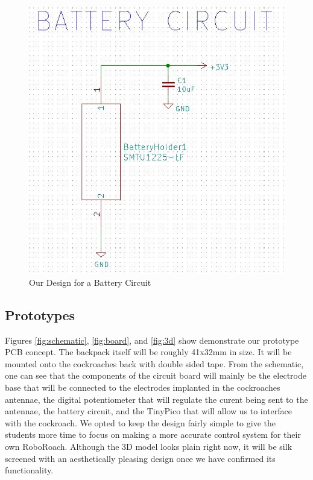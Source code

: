 \documentclass{article}
\begin{document}
\begin{figure}[ht!]
\centering
\includegraphics[scale=0.4]{Newbattery.JPG}
\caption{Our Design for a Battery Circuit}
\label{fig:newbatt}
\end{figure}

\subsection{Prototypes}
\par Figures \ref{fig:schematic}, \ref{fig:board}, and \ref{fig:3d} show demonstrate our prototype PCB concept. The backpack itself will be roughly 41x32mm in size. It will be mounted onto the cockroaches back with double sided tape. From the schematic, one can see that the components of the circuit board will mainly be the electrode base that will be connected to the electrodes implanted in the cockroaches antennae, the digital potentiometer that will regulate the curent being sent to the antennae, the battery circuit, and the TinyPico that will allow us to interface with the cockroach. We opted to keep the design fairly simple to give the students more time to focus on making a more accurate control system for their own RoboRoach. Although the 3D model looks plain right now, it will be silk screened with an aesthetically pleasing design once we have confirmed its functionality.
\end{document}
